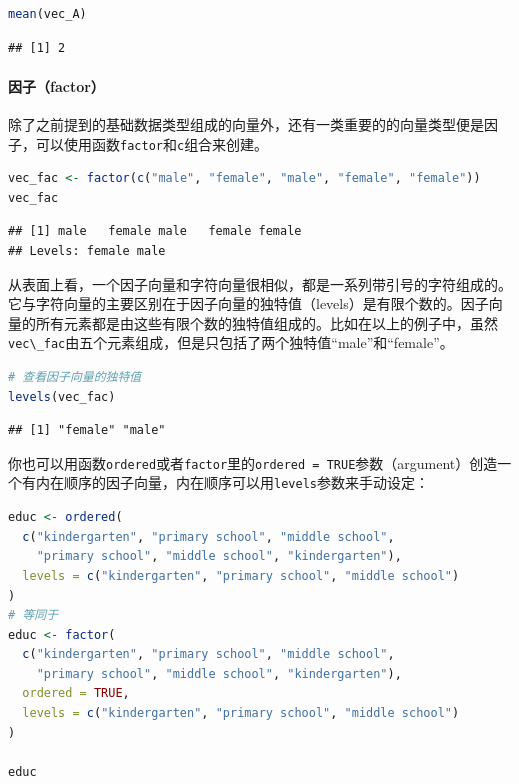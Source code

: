 \documentclass[]{ctexbook}
\let\oldparagraph\paragraph
\renewcommand{\paragraph}[1]{\oldparagraph{#1}\mbox{}}
\newcommand{\passthrough}[1]{#1}
\begin{document}
\begin{lstlisting}[language=R]
mean(vec_A)
\end{lstlisting}

\begin{lstlisting}
## [1] 2
\end{lstlisting}

\hypertarget{ux56e0ux5b50factor}{%
\paragraph{因子（factor）}\label{ux56e0ux5b50factor}}

除了之前提到的基础数据类型组成的向量外，还有一类重要的的向量类型便是因子，可以使用函数\passthrough{\lstinline!factor!}和\passthrough{\lstinline!c!}组合来创建。

\begin{lstlisting}[language=R]
vec_fac <- factor(c("male", "female", "male", "female", "female"))
vec_fac
\end{lstlisting}

\begin{lstlisting}
## [1] male   female male   female female
## Levels: female male
\end{lstlisting}

从表面上看，一个因子向量和字符向量很相似，都是一系列带引号的字符组成的。它与字符向量的主要区别在于因子向量的独特值（levels）是有限个数的。因子向量的所有元素都是由这些有限个数的独特值组成的。比如在以上的例子中，虽然\passthrough{\lstinline!vec\_fac!}由五个元素组成，但是只包括了两个独特值``male''和``female''。

\begin{lstlisting}[language=R]
# 查看因子向量的独特值
levels(vec_fac)
\end{lstlisting}

\begin{lstlisting}
## [1] "female" "male"
\end{lstlisting}

你也可以用函数\passthrough{\lstinline!ordered!}或者\passthrough{\lstinline!factor!}里的\passthrough{\lstinline!ordered = TRUE!}参数（argument）创造一个有内在顺序的因子向量，内在顺序可以用\passthrough{\lstinline!levels!}参数来手动设定：

\begin{lstlisting}[language=R]
educ <- ordered(
  c("kindergarten", "primary school", "middle school", 
    "primary school", "middle school", "kindergarten"),
  levels = c("kindergarten", "primary school", "middle school")
)
# 等同于
educ <- factor(
  c("kindergarten", "primary school", "middle school", 
    "primary school", "middle school", "kindergarten"),
  ordered = TRUE, 
  levels = c("kindergarten", "primary school", "middle school")
)

educ
\end{lstlisting}
\end{document}
